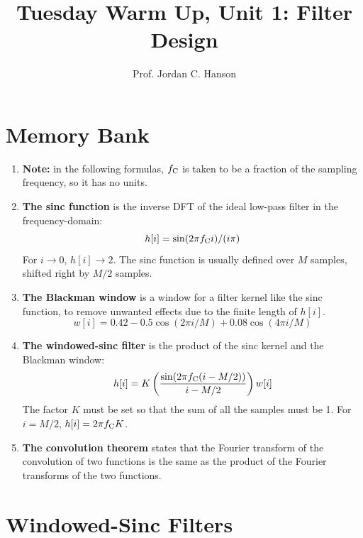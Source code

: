\documentclass{article}
\begin{document}
\twocolumn

\title{Tuesday Warm Up, Unit 1: Filter Design}
\author{Prof. Jordan C. Hanson}
\maketitle

\section{Memory Bank}

\begin{enumerate}
\item \textbf{Note:} in the following formulas, $f_{\rm C}$ is taken to be a fraction of the sampling frequency, so it has no units.
\item \textbf{The sinc function} is the inverse DFT of the ideal low-pass filter in the frequency-domain:
\begin{equation}
h[i] = \sin(2\pi f_{\rm C}i)/(i\pi)
\end{equation}
For $i\to 0$, $h[i] \to 2$.  The sinc function is usually defined over $M$ samples, shifted right by $M/2$ samples.
\item \textbf{The Blackman window} is a window for a filter kernel like the sinc function, to remove unwanted effects due to the finite length of $h[i]$.
\begin{equation}
w[i] = 0.42 - 0.5\cos(2\pi i/M)+0.08\cos(4\pi i/M)
\end{equation}
\item \textbf{The windowed-sinc filter} is the product of the sinc kernel and the Blackman window:
\begin{equation}
h[i] = K \left(\frac{\sin(2\pi f_{\rm C}(i-M/2))}{i-M/2}\right)w[i] \label{eq:1}
\end{equation}
The factor $K$ must be set so that the sum of all the samples must be 1.  For $i=M/2$, $h[i] = 2\pi f_{\rm C} K$.
\item \textbf{The convolution theorem} states that the Fourier transform of the convolution of two functions is the same as the product of the Fourier transforms of the two functions.
\end{enumerate}

\section{Windowed-Sinc Filters}
\end{document}

